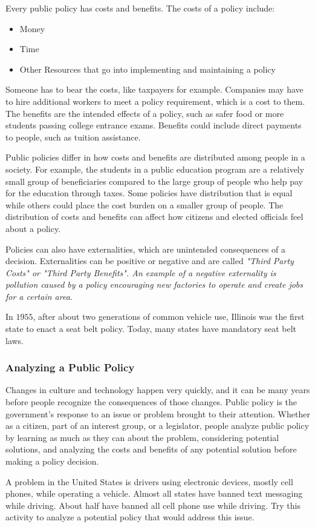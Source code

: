 Every public policy has costs and benefits. The costs of a policy include:

\begin{itemize}
    \item Money
    \item Time
    \item Other Resources that go into implementing and maintaining a policy
\end{itemize}

Someone has to bear the costs, like taxpayers for example. Companies may have to hire additional workers to meet a policy requirement, which is a cost to them. The benefits are the intended effects of a policy, such as safer food or more students passing college entrance exams. Benefits could include direct payments to people, such as tuition assistance.

Public policies differ in how costs and benefits are distributed among people in a society. For example, the students in a public education program are a relatively small group of beneficiaries compared to the large group of people who help pay for the education through taxes. Some policies have distribution that is equal while others could place the cost burden on a smaller group of people. The distribution of costs and benefits can affect how citizens and elected officials feel about a policy.

Policies can also have externalities, which are unintended consequences of a decision. Externalities can be positive or negative and are called \it{"Third Party Costs"} or \it{"Third Party Benefits"}. An example of a negative externality is pollution caused by a policy encouraging new factories to operate and create jobs for a certain area.

In $1955$, after about two generations of common vehicle use, Illinois was the first state to enact a seat belt policy. Today, many states have mandatory seat belt laws.

\subsubsection*{Analyzing a Public Policy}

Changes in culture and technology happen very quickly, and it can be many years before people recognize the consequences of those changes. Public policy is the government's response to an issue or problem brought to their attention. Whether as a citizen, part of an interest group, or a legislator, people analyze public policy by learning as much as they can about the problem, considering potential solutions, and analyzing the costs and benefits of any potential solution before making a policy decision.

A problem in the United States is drivers using electronic devices, mostly cell phones, while operating a vehicle. Almost all states have banned text messaging while driving. About half have banned all cell phone use while driving. Try this activity to analyze a potential policy that would address this issue.

\newpage
